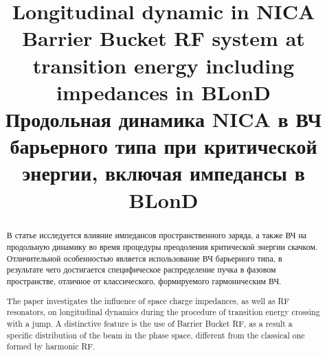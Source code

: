 \documentclass[a4paper]{panl}
\begin{document}
%
\title{Longitudinal dynamic in NICA Barrier Bucket RF system at transition energy including impedances in BLonD \\ Продольная динамика NICA в ВЧ барьерного типа при критической энергии, включая импедансы в BLonD}
\maketitle
{}

\setcounter{footnote}{0}

\begin{abstract}
В статье исследуется влияние импедансов пространственного заряда, а также ВЧ на продольную динамику во время процедуры преодоления критической энергии скачком. Отличительной особенностью является использование ВЧ барьерного типа, в результате чего достигается специфическое распределение пучка в фазовом пространстве, отличное от классического, формируемого гармоническим ВЧ.\
\vspace{0.2cm}

The paper investigates the influence of space charge impedances, as well as RF resonators, on longitudinal dynamics during the procedure of transition energy crossing with a jump. A distinctive feature is the use of Barrier Bucket RF, as a result a specific distribution of the beam in the phase space, different from the classical one formed by harmonic RF.
\end{abstract}
\vspace*{6pt}
\end{document}
